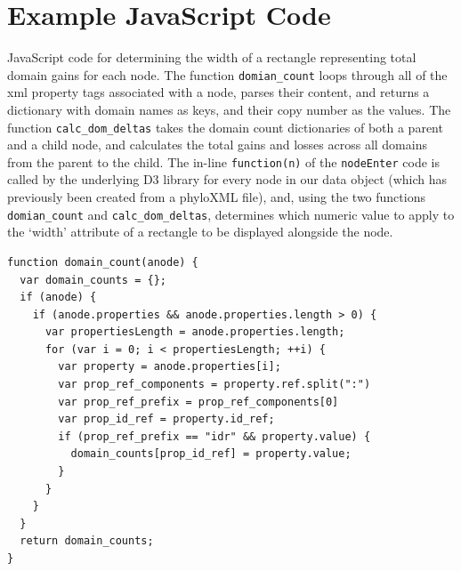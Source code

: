 \documentclass[12pt,a4paper]{article}
\begin{document}
\section{Example JavaScript Code}
\label{sec:gains_js_code}
JavaScript code for determining the width of a rectangle representing total domain gains for each node. The function \texttt{domian\_count} loops through all of the xml property tags associated with a node, parses their content, and returns a dictionary with domain names as keys, and their copy number as the values. The function \texttt{calc\_dom\_deltas} takes the domain count dictionaries of both a parent and a child node, and calculates the total gains and losses across all domains from the parent to the child. The in-line \texttt{function(n)} of the \texttt{nodeEnter} code is called by the underlying D3 library for every node in our data object (which has previously been created from a phyloXML file), and, using the two functions \texttt{domian\_count} and \texttt{calc\_dom\_deltas}, determines which numeric value to apply to the `width' attribute of a rectangle to be displayed alongside the node.
\singlespace
\footnotesize
\begin{verbatim}
function domain_count(anode) {
  var domain_counts = {};
  if (anode) {
    if (anode.properties && anode.properties.length > 0) {
      var propertiesLength = anode.properties.length;
      for (var i = 0; i < propertiesLength; ++i) {
        var property = anode.properties[i];
        var prop_ref_components = property.ref.split(":")
        var prop_ref_prefix = prop_ref_components[0]
        var prop_id_ref = property.id_ref;
        if (prop_ref_prefix == "idr" && property.value) {
          domain_counts[prop_id_ref] = property.value;
        }
      }
    }
  }
  return domain_counts;
}
\end{verbatim}
\newpage
\end{document}
